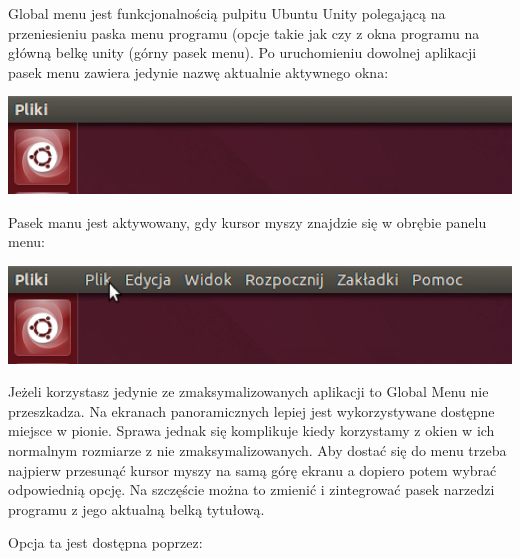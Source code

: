 Global menu jest funkcjonalnością pulpitu Ubuntu Unity polegającą na przeniesieniu paska menu programu (opcje takie jak   czy  z okna programu na główną belkę unity (górny pasek menu). Po uruchomieniu dowolnej aplikacji pasek menu zawiera jedynie nazwę aktualnie aktywnego okna:

\begin{center}
	\includegraphics[width=\linewidth]{images/unity_menu_bar2.png}
\end{center}

Pasek manu jest aktywowany, gdy kursor myszy znajdzie się w obrębie panelu menu:

\begin{center}
	\includegraphics[width=\linewidth]{images/unity_menu_bar3.png}
\end{center}

Jeżeli korzystasz jedynie ze zmaksymalizowanych aplikacji to Global Menu nie przeszkadza. Na ekranach panoramicznych lepiej jest wykorzystywane dostępne miejsce w pionie. Sprawa jednak się komplikuje kiedy korzystamy z okien w ich normalnym rozmiarze z nie zmaksymalizowanych. Aby dostać się do menu trzeba najpierw przesunąć kursor myszy na samą górę ekranu a dopiero potem wybrać odpowiednią opcję. Na szczęście można to zmienić i zintegrować pasek narzedzi programu z jego aktualną belką tytułową. 

Opcja ta jest dostępna poprzez:
\noindent {}
